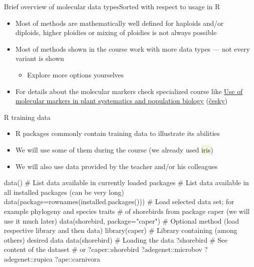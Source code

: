 \documentclass[compress, ucs, xelatex, 11pt, xcolor=svgnames, aspectratio=169,
	hyperref={
		bookmarks=true,
		unicode=true,
		colorlinks=true,
		pdftitle={Molecular data in R},
		plainpages=false,
		pdfauthor={Vojtech Zeisek},
		pdfsubject={Course about phylogeny and evolution in R},
		pdfcreator={XeLaTeX},
		pdfkeywords={R, evolution, phylogeny, molecular data},
		linkcolor=Crimson, %
		anchorcolor=Magenta, %
		citecolor=Magenta, %
		filecolor=Magenta, %
		menucolor=Magenta, %
		urlcolor=DodgerBlue, %
		pdftex},
	url={hyphens, lowtilde} %
	]{beamer}
\renewcommand{\texttt}[1]{\colorbox{Beige}{{\ttfamily #1}}}
\begin{document}
\begin{frame}[allowframebreaks]{Brief overview of molecular data types}{Sorted with respect to usage in R}
\begin{itemize}
\begin{itemize}
\begin{itemize}
				\item There are special tools to process raw data from the machines --- not part of the course
				\item Modern methods are quickly developing and able to produce $\sim$10$^{12}$~bp per run and multiplex many individuals
			\end{itemize}
			\item Whole sequences (probes/loci or longer assembled regions) or \href{https://en.wikipedia.org/wiki/Single-nucleotide_polymorphism}{SNPs} (\href{https://en.wikipedia.org/wiki/SNP_genotyping}{Single Nucleotide Polymorphism} --- only polymorphic sites are retained)
		\end{itemize}
		\item Most of methods are mathematically well defined for haploids and/or diploids, higher ploidies or mixing of ploidies is not always possible
		\item Most of methods shown in the course work with more data types --- not every variant is shown
		\begin{itemize}
			\item Explore more options yourselves
		\end{itemize}
		\item For details about the molecular markers check specialized course like \href{https://is.cuni.cz/studium/eng/predmety/index.php?do=predmet&kod=MB120P44}{Use of molecular markers in plant systematics and population biology} (\href{https://is.cuni.cz/studium/predmety/index.php?do=predmet&kod=MB120P44}{česky})
	\end{itemize}
\end{frame}

\begin{frame}[fragile]{R training data}
	\begin{itemize}
		\item R packages commonly contain training data to illustrate its abilities
		\item We will use some of them during the course (we already used \texttt{iris})
		\item We will also use data provided by the teacher and/or his colleagues
	\end{itemize}
	\begin{spluscode}
    data() # List data available in currently loaded packages
    # List data available in all installed packages (can be very long)
    data(package=rownames(installed.packages()))
    # Load selected data set; for example phylogeny and species traits
    # of shorebirds from package caper (we will use it much later)
    data(shorebird, package="caper")
    # Optional method (load respective library and then data)
    library(caper) # Library containing (among others) desired data
    data(shorebird) # Loading the data
    ?shorebird # See content of the dataset # or ?caper::shorebird
    ?adegenet::microbov
    ?adegenet::rupica
    ?ape::carnivora
	\end{spluscode}
\end{frame}
\end{document}
